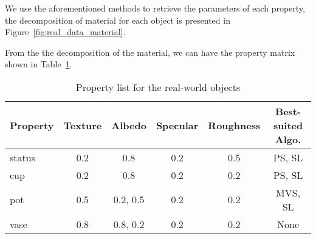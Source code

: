 We use the aforementioned methods to retrieve the parameters of each property, the decomposition of material for each object is presented in Figure~\ref{fig:real_data_material}.

From the the decomposition of the material, we can have the property matrix shown in Table~\ref{tab:real_data_prop_list}.
\begin{table}[!htbp]
  \centering
  \begin{tabular}{l*{5}{c}}
  \hline
  \textbf{Property} & Texture & Albedo & Specular & Roughness & Best-suited Algo.\\
  \hline
  status & 0.2 & 0.8 & 0.2 & 0.5 & PS, SL\\
  cup & 0.2 & 0.8 & 0.2 & 0.2 & PS, SL\\
  pot & 0.5 & 0.2, 0.5 & 0.2 & 0.2 & MVS, SL\\
  vase & 0.8 & 0.8, 0.2 & 0.2 & 0.2 & None\\
  \hline
  \end{tabular}
  \caption{Property list for the real-world objects}
  \label{tab:real_data_prop_list}
\end{table}

